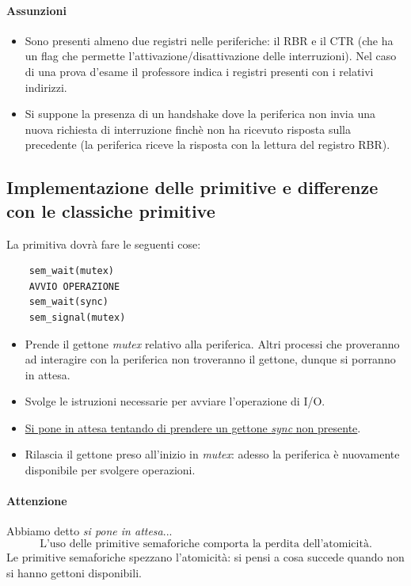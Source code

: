 \paragraph{Assunzioni}
\begin{itemize}
	\item Sono presenti almeno due registri nelle periferiche: il RBR e il CTR (che ha un flag che permette l'attivazione/disattivazione delle interruzioni). Nel caso di una prova d'esame il professore indica i registri presenti con i relativi indirizzi.
	\item Si suppone la presenza di un handshake dove la periferica non invia una nuova richiesta di interruzione finchè non ha ricevuto risposta sulla precedente (la periferica riceve la risposta con la lettura del registro RBR).
\end{itemize}
\subsection{Implementazione delle primitive e differenze con le classiche primitive}
La primitiva dovrà fare le seguenti cose:
\begin{verbatim}
	sem_wait(mutex)
	AVVIO OPERAZIONE
	sem_wait(sync)
	sem_signal(mutex)
\end{verbatim}
\begin{itemize}
	\item Prende il gettone \emph{mutex} relativo alla periferica. Altri processi che proveranno ad interagire con la periferica non troveranno il gettone, dunque si porranno in attesa.
	\item Svolge le istruzioni necessarie per avviare l'operazione di I/O.
	\item \underline{Si pone in attesa tentando di prendere un gettone \emph{sync} non presente}.
	\item Rilascia il gettone preso all'inizio in \emph{mutex}: adesso la periferica è nuovamente disponibile per svolgere operazioni.
\end{itemize}
\paragraph{Attenzione} Abbiamo detto \textit{si pone in attesa}...\[\boxed{\text{L'uso delle primitive semaforiche comporta la perdita dell'atomicità.}}\]
Le primitive semaforiche spezzano l'atomicità: si pensi a cosa succede quando non si hanno gettoni disponibili.

